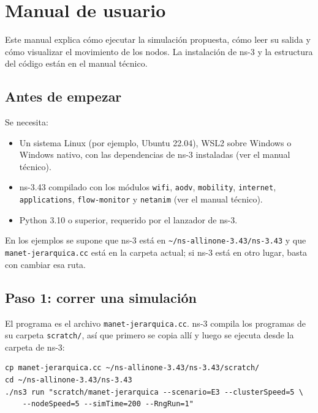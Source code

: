 \section{Manual de usuario}
\label{sec:manual-usuario}

Este manual explica cómo ejecutar la simulación propuesta, cómo leer su salida y cómo
visualizar el movimiento de los nodos. La instalación de ns-3 y la estructura del código están en el manual técnico.

\subsection{Antes de empezar}

Se necesita:

\begin{itemize}
    \item Un sistema Linux (por ejemplo, Ubuntu 22.04), WSL2 sobre Windows o Windows
    nativo, con las dependencias de ns-3 instaladas (ver el manual técnico).
    \item ns-3.43 compilado con los módulos \texttt{wifi}, \texttt{aodv},
    \texttt{mobility}, \texttt{internet}, \texttt{applications}, \texttt{flow-monitor}
    y \texttt{netanim} (ver el manual técnico).
    \item Python 3.10 o superior, requerido por el lanzador de ns-3.
\end{itemize}

En los ejemplos se supone que ns-3 está en \texttt{\textasciitilde/ns-allinone-3.43/ns-3.43}
y que \texttt{manet-jerarquica.cc} está en la carpeta actual; si ns-3 está en otro lugar,
basta con cambiar esa ruta.

\subsection{Paso 1: correr una simulación}

El programa es el archivo \texttt{manet-jerarquica.cc}. ns-3 compila los programas de su
carpeta \texttt{scratch/}, así que primero se copia allí y luego se ejecuta desde la
carpeta de ns-3:

\begin{verbatim}
cp manet-jerarquica.cc ~/ns-allinone-3.43/ns-3.43/scratch/
cd ~/ns-allinone-3.43/ns-3.43
./ns3 run "scratch/manet-jerarquica --scenario=E3 --clusterSpeed=5 \
    --nodeSpeed=5 --simTime=200 --RngRun=1"
\end{verbatim}

